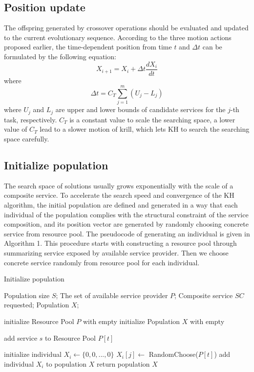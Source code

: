 \documentclass[journal]{IEEEtran}
\begin{document}
\subsection{Position update}
The offspring generated by crossover operations should be evaluated and updated to the current evolutionary sequence.
According to the three motion actions proposed earlier, the time-dependent position from time $t$ and $\Delta t$ can be formulated by the following equation:
\begin{equation}
X_{i+1} = X_i + \Delta t \frac{dX_i}{dt}
\end{equation}
where
\begin{equation}
\Delta t = C_T\sum_{j=1}^{m}(U_j - L_j)
\end{equation}
where $U_j$ and $L_j$ are upper and lower bounds of candidate services for the $j$-th task, respectively. $C_T$ is a constant value to scale the searching space, a lower value of $C_T$ lead to a slower motion of krill, which lets KH to search the searching space carefully.


\subsection{Initialize population}
The search space of solutions usually grows exponentially with the scale of a composite service. To accelerate the search speed and convergence of the KH algorithm, the initial population are defined and generated in a way that each individual of the population complies with the structural constraint of the service composition, and its position vector are generated by randomly choosing concrete service from resource pool. The pseudocode of generating an individual is given in Algorithm 1. This procedure starts with constructing a resource pool through summarizing service exposed by available service provider. Then we choose concrete service randomly from resource pool for each individual. 

\begin{algorithm}
\caption{Initialize population}
\label{Initialize population}
\begin{algorithmic}[1]

\REQUIRE Population size $S$; The set of available service provider $P$; Composite service $SC$ requested;
\ENSURE Population $X$;

\STATE initialize Resource Pool $P$ with empty
\STATE initialize Population $X$ with empty

      \STATE add service $s$ to Resource Pool $P[t]$
    \ENDIF
  \ENDFOR  
\ENDFOR

  \STATE initialize individual $X_i \leftarrow \{0,0,...,0\}$
    \STATE $X_i[j] \leftarrow$ RandomChoose($P[t]$)
  \ENDFOR
  \STATE add individual $X_i$ to population $X$
\ENDFOR
\STATE return population $X$
\end{algorithmic}
\end{algorithm}
\end{document}
